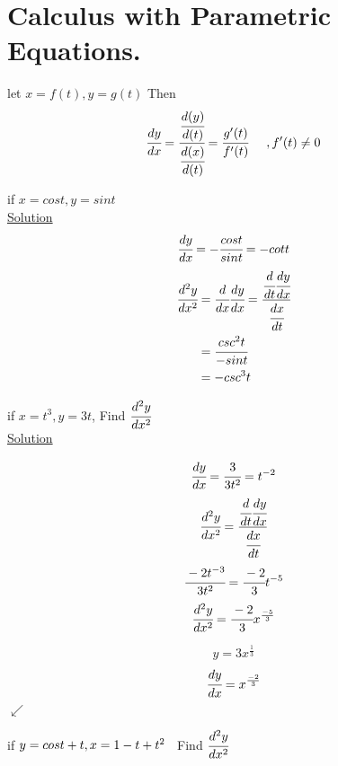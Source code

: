 \section{Calculus with Parametric Equations.}
let $x=f(t) , y=g(t)$   Then \\ $$\cfrac{dy}{dx}=\cfrac{\cfrac{d(y)}{d(t)}}{\cfrac{d(x)}{d(t)}}=\cfrac{g'(t)}{f'(t)}\hspace{.5cm} ,f'(t)\neq 0$$
\begin{example}
if $x=cost , y=sint$\hspace{1cm}\\
\underline{\textbf{\large}\color{smalt(darkpowderblue)}Solution} \\
$$\cfrac{dy}{dx}=-\cfrac{cost}{sint}=-cott$$
  \begin{equation}
\begin{split} \cfrac{d^2y}{dx^2} &=\cfrac{d}{dx} \cfrac{dy}{dx} = \cfrac{\cfrac{d}{dt}\cfrac{dy}{dx}}{\cfrac{dx}{dt}} \\
&= \cfrac{csc^2t}{-sint} \\
&= -csc^3t
\end{split}
\end{equation}
\end{example}
\noindent{\color{smalt(darkpowderblue)}\rule{\linewidth}{.2mm}}
\begin{example}
if $x=t^3 , y=3t$, Find $\cfrac{d^2y}{dx^2}$\\
\underline{\textbf{\large}\color{smalt(darkpowderblue)}Solution} \\
\noindent\begin{minipage}{0.3\textwidth}
$$\cfrac{dy}{dx}=\cfrac{3}{3t^2}=t^{-2}$$
$$\cfrac{d^2y}{dx^2}=\cfrac{\cfrac{d}{dt}\cfrac{dy}{dx}}{\cfrac{dx}{dt}}$$ 
$$\cfrac{-2t^{-3}}{3t^2} = \cfrac{-2}{3}t^{-5}$$
$$\cfrac{d^2y}{dx^2}=\cfrac{-2}{3}x^\frac{-5}{3}$$
\end{minipage}
\noindent\begin{minipage}{0.6\textwidth}
$$y=3x^\frac{1}{3}$$
$$\cfrac{dy}{dx}=x^\frac{-2}{3}$$
$\swarrow$
\end{minipage}
\end{example}
\begin{exercise}
if $y=cost+t ,\\ x=1-t+t^2$ \hspace{5mm}~Find $\cfrac{d^2y}{dx^2}$ 
\end{exercise}
